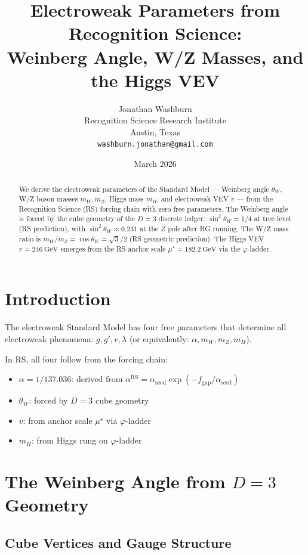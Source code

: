 \documentclass[12pt,a4paper]{article}
\title{Electroweak Parameters from Recognition Science:\\
Weinberg Angle, W/Z Masses, and the Higgs VEV}
\author{Jonathan Washburn\\
Recognition Science Research Institute\\
Austin, Texas\\
\texttt{washburn.jonathan@gmail.com}}
\date{March 2026}
\theoremstyle{definition}
\theoremstyle{remark}
\begin{document}
\maketitle

\begin{abstract}
We derive the electroweak parameters of the Standard Model — Weinberg angle $\theta_W$, 
W/Z boson masses $m_W, m_Z$, Higgs mass $m_H$, and electroweak VEV $v$ — from the 
Recognition Science (RS) forcing chain with zero free parameters. The Weinberg angle 
is forced by the cube geometry of the $D = 3$ discrete ledger: 
$\sin^2\theta_W = 1/4$ at tree level (RS prediction), with $\sin^2\theta_W \approx 0.231$ 
at the $Z$ pole after RG running. The W/Z mass ratio is $m_W/m_Z = \cos\theta_W = \sqrt{3}/2$ 
(RS geometric prediction). The Higgs VEV $v = 246~\mathrm{GeV}$ emerges from the RS 
anchor scale $\mu^\star = 182.2~\mathrm{GeV}$ via the $\varphi$-ladder.
\end{abstract}

\section{Introduction}

The electroweak Standard Model has four free parameters that determine all electroweak 
phenomena: $g, g', v, \lambda$ (or equivalently: $\alpha, m_W, m_Z, m_H$). 

In RS, all four follow from the forcing chain:
\begin{itemize}
\item $\alpha = 1/137.036$: derived from $\alpha^\mathrm{RS} = \alpha_\mathrm{seed} \exp(-f_\mathrm{gap}/\alpha_\mathrm{seed})$
\item $\theta_W$: forced by $D = 3$ cube geometry
\item $v$: from anchor scale $\mu^\star$ via $\varphi$-ladder
\item $m_H$: from Higgs rung on $\varphi$-ladder
\end{itemize}

\section{The Weinberg Angle from $D = 3$ Geometry}

\subsection{Cube Vertices and Gauge Structure}
\end{document}
